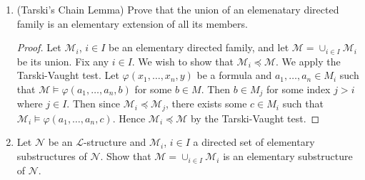 \documentclass{article}
\begin{document}
\begin{enumerate}
\begin{proof}
      $\exists$: Let $\varphi(\overline{a},b_0,\overline{b_1})$ be a
      formula where the property holds via $c_0\in(0,1)$ and
      $\overline{c_1}\subset(0,1)$. Then $\exists
      x\,\varphi(\overline{a},x,\overline{b})$ holds in $\mathcal{M}$ iff
      there exists some $r\in\mathbb{R}$ such that
      $\varphi(\overline{a},r,\overline{b_1})$ holds in $\mathcal{M}$ iff
    \end{proof}


  \item (Tarski's Chain Lemma) Prove that the union of an elemenatary
    directed family is an elementary extension of all its members.
    \begin{proof}
      Let $\mathcal{M}_i$, $i\in I$ be an elementary directed family, and
      let $\mathcal{M}=\cup_{i\in I}\mathcal{M}_i$ be its union. Fix any
      $i\in I$. We wish to show that $\mathcal{M}_i\preceq\mathcal{M}$. We
      apply the Tarski-Vaught test. Let $\varphi(x_1,\ldots,x_n,y)$ be a
      formula and $a_1,\ldots,a_n\in M_i$ such that
      $\mathcal{M}\models\varphi(a_1,\ldots,a_n,b)$ for some $b\in M$. Then
      $b\in M_j$ for some index $j>i$ where $j\in I$. Then since
      $\mathcal{M}_i\preceq\mathcal{M}_j$, there exists some $c\in M_i$
      such that $\mathcal{M}_i\models\varphi(a_1,\ldots,a_n,c)$. Hence
      $\mathcal{M}_i\preceq\mathcal{M}$ by the Tarski-Vaught test.
    \end{proof}

  \item Let $\mathcal{N}$ be an $\mathcal{L}$-structure and
    $\mathcal{M}_i$, $i\in I$ a directed set of elementary substructures of
    $\mathcal{N}$. Show that $\mathcal{M}=\cup_{i\in I}\mathcal{M}_i$ is an
    elementary substructure of $\mathcal{N}$.


\end{enumerate}
\end{document}
